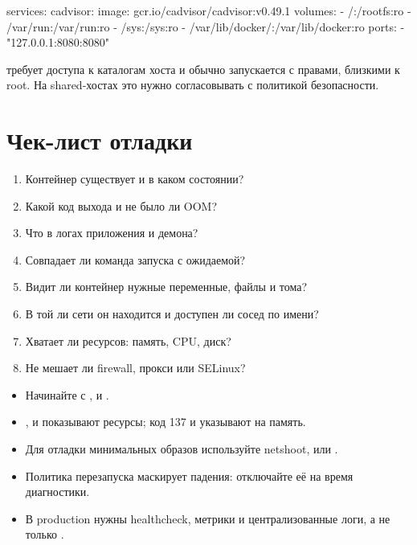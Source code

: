 \begin{code}[language=composeyaml]
services:
  cadvisor:
    image: gcr.io/cadvisor/cadvisor:v0.49.1
    volumes:
      - /:/rootfs:ro
      - /var/run:/var/run:ro
      - /sys:/sys:ro
      - /var/lib/docker/:/var/lib/docker:ro
    ports:
      - "127.0.0.1:8080:8080"
\end{code}

\begin{notebox}
 требует доступа к каталогам хоста и обычно запускается
с правами, близкими к root. На shared-хостах это нужно согласовывать
с политикой безопасности.
\end{notebox}

\section{Чек-лист отладки}

\begin{enumerate}
  \item Контейнер существует и в каком состоянии?
  \item Какой код выхода и не было ли OOM?
  \item Что в логах приложения и демона?
  \item Совпадает ли команда запуска с ожидаемой?
  \item Видит ли контейнер нужные переменные, файлы и тома?
  \item В той ли сети он находится и доступен ли сосед по имени?
  \item Хватает ли ресурсов: память, CPU, диск?
  \item Не мешает ли firewall, прокси или SELinux?
\end{enumerate}

\begin{summarybox}
\begin{itemize}
  \item Начинайте с ,  и .
  \item {},  и  показывают ресурсы;
        код 137 и  указывают на память.
  \item Для отладки минимальных образов используйте netshoot,
         или .
  \item Политика перезапуска маскирует падения: отключайте её на время
        диагностики.
  \item В production нужны healthcheck, метрики и централизованные
        логи, а не только .
\end{itemize}
\end{summarybox}


